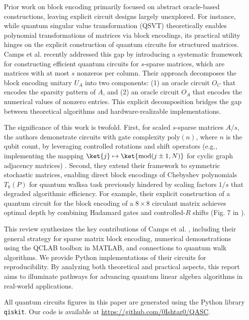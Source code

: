 \documentclass{article}
\begin{document}
    Prior work on block encoding primarily focused on abstract oracle-based constructions, leaving explicit circuit designs largely unexplored. For instance, while quantum singular value transformation (QSVT) \cite{Gilyen2019} theoretically enables polynomial transformations of matrices via block encodings, its practical utility hinges on the explicit construction of quantum circuits for structured matrices. Camps et al. \cite{EQC} recently addressed this gap by introducing a systematic framework for constructing efficient quantum circuits for $s$-sparse matrices, which are matrices with at most $s$ nonzeros per column. Their approach decomposes the block encoding unitary $U_A$ into two components: (1) an oracle circuit $O_C$ that encodes the sparsity pattern of $A$, and (2) an oracle circuit $O_A$ that encodes the numerical values of nonzero entries. This explicit decomposition bridges the gap between theoretical algorithms and hardware-realizable implementations.

    The significance of this work is twofold. First, for scaled $s$-sparse matrices $A/s$, the authors demonstrate circuits with gate complexity $\text{poly}(n)$, where $n$ is the qubit count, by leveraging controlled rotations and shift operators (e.g., implementing the mapping $\ket{j} \mapsto \ket{\text{mod}(j \pm 1, N)}$ for cyclic graph adjacency matrices) \cite{EQC}. Second, they extend their framework to symmetric stochastic matrices, enabling direct block encodings of Chebyshev polynomials $T_k(P)$ for quantum walks\textemdash a task previously hindered by scaling factors $1/s$ that degraded algorithmic efficiency. For example, their explicit construction of a quantum circuit for the block encoding of a $8 \times 8$ circulant matrix achieves optimal depth by combining Hadamard gates and controlled-$R$ shifts (Fig. 7 in \cite{EQC}).

    This review synthesizes the key contributions of Camps et al. \cite{EQC}, including their general strategy for sparse matrix block encoding, numerical demonstrations using the QCLAB toolbox in MATLAB, and connections to quantum walk algorithms. We provide Python implementations of their circuits for reproducibility. By analyzing both theoretical and practical aspects, this report aims to illuminate pathways for advancing quantum linear algebra algorithms in real-world applications.

    All quantum circuits figures in this paper are generated using the Python library \texttt{qiskit}. Our code is available at \url{https://github.com/0Ishtar0/QASC}.
\end{document}

